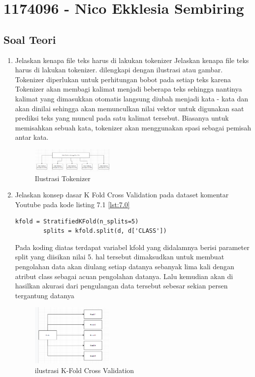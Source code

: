 \section{1174096 - Nico Ekklesia Sembiring}
\subsection{Soal Teori}
\begin{enumerate}

	\item Jelaskan kenapa ﬁle teks harus di lakukan tokenizer
	\hfill\break
    Jelaskan kenapa file teks harus di lakukan tokenizer. dilengkapi dengan ilustrasi atau gambar. 
    \hfill \break
    Tokenizer diperlukan untuk perhitungan bobot pada setiap teks karena Tokenizer akan membagi kalimat menjadi beberapa teks sehingga nantinya kalimat yang dimasukkan otomatis langsung diubah menjadi kata - kata dan akan dinilai sehingga akan memunculkan nilai vektor untuk digunakan saat prediksi teks yang muncul pada satu kalimat tersebut. Biasanya untuk memisahkan sebuah kata, tokenizer akan menggunakan spasi sebagai pemisah antar kata.
    
    \begin{figure}[H]
	\centering
		\includegraphics[width=4cm]{figures/1174096/tugas7/teori_1.PNG}
		\caption{Ilustrasi Tokenizer}
	\end{figure}

	\item Jelaskan konsep dasar K Fold Cross Validation pada dataset komentar Youtube pada kode listing 7.1 \ref{lst:7.0}
    \begin{lstlisting}[caption=K Fold Cross Validation,label={lst:7.0}]
        kfold = StratifiedKFold(n_splits=5)
        splits = kfold.split(d, d['CLASS'])
        \end{lstlisting}
    \hfill\break
    Pada koding diatas terdapat variabel kfold yang didalamnya berisi parameter split yang diisikan nilai 5. hal tersebut dimaksudkan untuk membuat pengolahan data akan diulang setiap datanya sebanyak lima kali dengan atribut class sebagai acuan pengolahan datanya. Lalu kemudian akan di hasilkan akurasi dari pengulangan data tersebut sebesar sekian persen tergantung datanya	
    \begin{figure}[H]
	\centering
		\includegraphics[width=4cm]{figures/1174096/tugas7/teori_2.PNG}
		\caption{ilustrasi K-Fold Cross Validation}
	\end{figure}


\end{enumerate}
